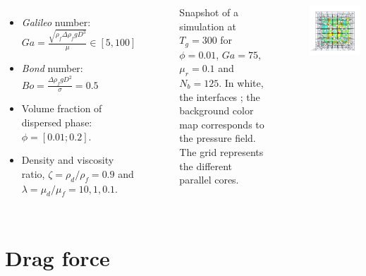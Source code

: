 \documentclass{sintefbeamer}
\begin{document}
\begin{frame}
\begin{columns}
{  \begin{itemize}
    \item \textit{Galileo} number: $Ga =\frac{\sqrt{\rho_f \Delta\rho_f gD^3}}{\mu} \in [5, 100]$
    \item \textit{Bond} number: $Bo = \frac{\Delta \rho_f g D^2}{\sigma} = 0.5$ 
    \item Volume fraction of dispersed phase: $\phi = [0.01;0.2]$. 
    \item Density and viscosity ratio, $\zeta=\rho_d/\rho_f=0.9$ and $\lambda=\mu_d/\mu_f= 10,1,0.1$. 
  \end{itemize}
  }
  \begin{figure}
    \caption{Snapshot of a simulation at $T_g = 300$ for $\phi = 0.01$, $Ga = 75$, $\mu_r = 0.1$ and $N_b = 125$. In white, the interfaces ; the background color map corresponds to the pressure field. The grid represents the different parallel cores.
    }
  \end{figure}
  \centering
  \href{videos/DNS.mp4}{}
  \includegraphics[width =  1.1\textwidth]{image/PHI_01_Ga_75.png}
  \end{columns}
\end{frame}

\section{Drag force}
\end{document}
